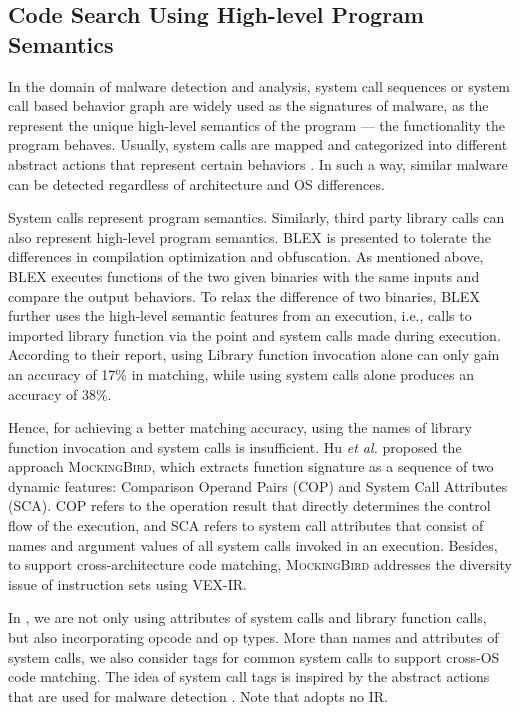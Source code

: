 \subsection{Code Search Using High-level Program Semantics}
In the domain of malware detection and analysis, system call sequences or system call based behavior graph \cite{DBLP:conf/uss/KolbitschCKKZW09} are widely used as the signatures of malware, as the represent the unique high-level semantics of the program --- the functionality the program behaves. Usually, system calls are mapped and categorized into different abstract actions that represent certain behaviors \cite{DBLP:conf/issta/CanaliLBKCK12}. In such a way, similar malware can be detected regardless of architecture and OS differences.

System calls represent program semantics. Similarly, third party library calls can also represent high-level program semantics.  \textsc{\small BLEX} \cite{egele2014blanket} is presented to tolerate the differences in compilation optimization and obfuscation. As mentioned above, \textsc{\small BLEX}  executes functions of the two given binaries with the same inputs and compare the output behaviors. To relax the difference of two binaries, \textsc{\small BLEX} further uses the high-level semantic features from an execution, i.e.,  calls to imported library function via the point
and system calls made during execution. According to their report, using Library function invocation alone can only gain an accuracy of 17\% in matching, while using system calls alone produces an accuracy of 38\%.

Hence, for achieving a better matching accuracy, using the names of library function invocation and system calls is insufficient.
Hu \emph{et al.} \cite{DBLP:conf/wcre/HuZLG16} proposed the approach \textsc{MockingBird}, which extracts function signature as a sequence of two dynamic features: Comparison Operand Pairs (COP) and System Call Attributes (SCA). COP refers to the operation result  that directly determines the control flow of the execution, and SCA refers to system call attributes that consist of names and argument values of all system calls invoked in an execution. Besides, to support cross-architecture code matching, \textsc{MockingBird} addresses the diversity issue of instruction sets using VEX-IR.

In \toolNew, we are not only using attributes of system calls and library function calls, but also incorporating opcode and op types. More than names and attributes of system calls, we also consider tags for common system calls to support cross-OS code matching. The idea of system call tags is inspired by the abstract actions that are used for malware detection \cite{DBLP:conf/issta/CanaliLBKCK12}. Note that  \toolNew adopts no IR.

